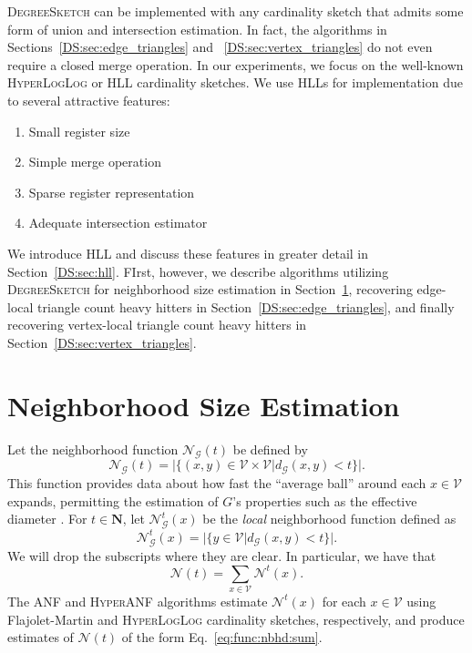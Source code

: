 \documentclass{report}
\newcommand{\algoname}[1]{\textnormal{\textsc{#1}}}
\begin{document}
\algoname{DegreeSketch} can be implemented with any cardinality sketch that admits some form of union and intersection estimation.
In fact, the algorithms in Sections~\ref{DS:sec:edge_triangles} and ~\ref{DS:sec:vertex_triangles} do not even require a closed merge operation.
In our experiments, we focus on the well-known \algoname{HyperLogLog} or \algoname{HLL} cardinality sketches.
We use \algoname{HLL}s for implementation due to several attractive features:
\begin{enumerate}
	\item Small register size
	\item Simple merge operation
	\item Sparse register representation
	\item Adequate intersection estimator
\end{enumerate}

We introduce \algoname{HLL} and discuss these features in greater detail in Section~\ref{DS:sec:hll}.
FIrst, however, we describe algorithms utilizing \algoname{DegreeSketch} for neighborhood size estimation in Section~\ref{DS:sec:neighborhoods}, recovering edge-local triangle count heavy hitters in Section~\ref{DS:sec:edge_triangles}, and finally recovering vertex-local triangle count heavy hitters in Section~\ref{DS:sec:vertex_triangles}.

\section{Neighborhood Size Estimation}
 \label{DS:sec:neighborhoods}

Let the neighborhood function $\mathcal{N}_\mathcal{G}(t)$ be defined by 
%
\begin{equation} \label{eq:func:nbhd}
	\mathcal{N}_\mathcal{G}(t) = |\{(x, y) \in \mathcal{V} \times \mathcal{V} | d_\mathcal{G}(x, y) < t\}|.
\end{equation}
%
This function provides data about how fast the ``average ball'' around each $x \in \mathcal{V}$ expands, permitting the estimation of $G$'s properties such as the effective diameter \cite{palmer2002anf}.
For $t \in \mathbf{N}$, let $\mathcal{N}_\mathcal{G}^t(x)$ be the \emph{local} neighborhood function defined as 
%
\begin{equation} \label{eq:func:nbhd:local}
	\mathcal{N}_\mathcal{G}^t(x) = |\{y \in \mathcal{V} | d_\mathcal{G}(x, y) < t\}|.
\end{equation}
%
We will drop the subscripts where they are clear.
In particular, we have that 
%
\begin{equation} \label{eq:func:nbhd:sum}
	\mathcal{N}(t) = \sum_{x \in \mathcal{V}} \mathcal{N}^t(x).
\end{equation}
%
The \algoname{ANF} \cite{palmer2002anf} and \algoname{HyperANF} \cite{boldi2011hyperanf} algorithms estimate $\mathcal{N}^t(x)$ for each $x \in \mathcal{V}$ using Flajolet-Martin and \algoname{HyperLogLog} cardinality sketches, respectively, and produce estimates of $\mathcal{N}(t)$ of the form Eq.~\eqref{eq:func:nbhd:sum}.
\end{document}
